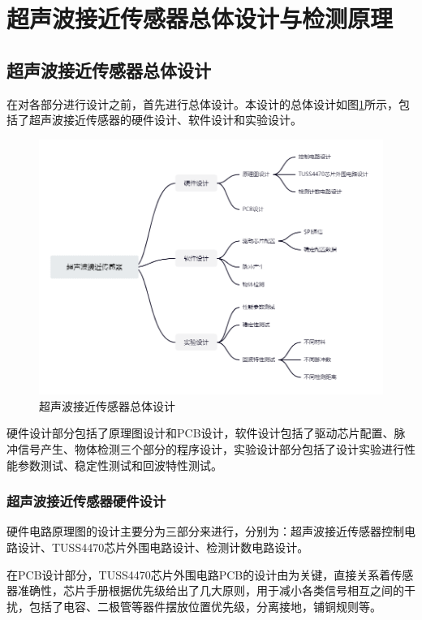 \newpage
\section{超声波接近传感器总体设计与检测原理}
\subsection{超声波接近传感器总体设计}
在对各部分进行设计之前，首先进行总体设计。本设计的总体设计如图\ref{超声波接近传感器总体设计}所示，包括了超声波接近传感器的硬件设计、软件设计和实验设计。
\begin{figure}[ht]
	\centering
	\includegraphics[width=12cm]{figure/overall designment.png}
	\caption{超声波接近传感器总体设计}
	\label{超声波接近传感器总体设计}
\end{figure}

硬件设计部分包括了原理图设计和PCB设计，软件设计包括了驱动芯片配置、脉冲信号产生、物体检测三个部分的程序设计，实验设计部分包括了设计实验进行性能参数测试、稳定性测试和回波特性测试。
\subsubsection{超声波接近传感器硬件设计}
硬件电路原理图的设计主要分为三部分来进行，分别为：超声波接近传感器控制电路设计、TUSS4470芯片外围电路设计、检测计数电路设计。\par
在PCB设计部分，TUSS4470芯片外围电路PCB的设计由为关键，直接关系着传感器准确性，芯片手册根据优先级给出了几大原则，用于减小各类信号相互之间的干扰，包括了电容、二极管等器件摆放位置优先级，分离接地，铺铜规则等。
